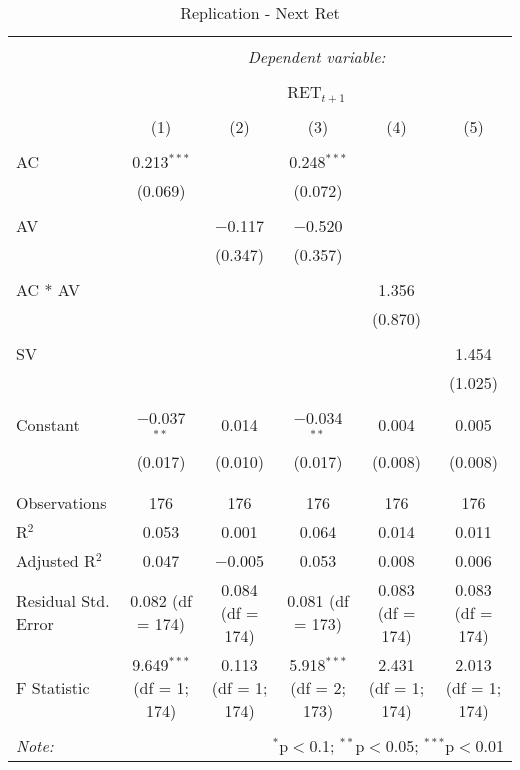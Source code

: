 
\begin{table}[!htbp] \centering 
  \caption{Replication - Next Ret} 
  \label{} 
\begin{adjustbox}{width=1\textwidth}
	\begin{tabular}{@{\extracolsep{5pt}}lccccc} 
\\[-1.8ex]\hline 
\hline \\[-1.8ex] 
 & \multicolumn{5}{c}{\textit{Dependent variable:}} \\ 
\cline{2-6} 
\\[-1.8ex] & \multicolumn{5}{c}{RET$_{t+1}$} \\ 
\\[-1.8ex] & (1) & (2) & (3) & (4) & (5)\\ 
\hline \\[-1.8ex] 
 AC & 0.213$^{***}$ &  & 0.248$^{***}$ &  &  \\ 
  & (0.069) &  & (0.072) &  &  \\ 
  & & & & & \\ 
 AV &  & $-$0.117 & $-$0.520 &  &  \\ 
  &  & (0.347) & (0.357) &  &  \\ 
  & & & & & \\ 
 AC * AV &  &  &  & 1.356 &  \\ 
  &  &  &  & (0.870) &  \\ 
  & & & & & \\ 
 SV &  &  &  &  & 1.454 \\ 
  &  &  &  &  & (1.025) \\ 
  & & & & & \\ 
 Constant & $-$0.037$^{**}$ & 0.014 & $-$0.034$^{**}$ & 0.004 & 0.005 \\ 
  & (0.017) & (0.010) & (0.017) & (0.008) & (0.008) \\ 
  & & & & & \\ 
\hline \\[-1.8ex] 
Observations & 176 & 176 & 176 & 176 & 176 \\ 
R$^{2}$ & 0.053 & 0.001 & 0.064 & 0.014 & 0.011 \\ 
Adjusted R$^{2}$ & 0.047 & $-$0.005 & 0.053 & 0.008 & 0.006 \\ 
Residual Std. Error & 0.082 (df = 174) & 0.084 (df = 174) & 0.081 (df = 173) & 0.083 (df = 174) & 0.083 (df = 174) \\ 
F Statistic & 9.649$^{***}$ (df = 1; 174) & 0.113 (df = 1; 174) & 5.918$^{***}$ (df = 2; 173) & 2.431 (df = 1; 174) & 2.013 (df = 1; 174) \\ 
\hline 
\hline \\[-1.8ex] 
\textit{Note:}  & \multicolumn{5}{r}{$^{*}$p$<$0.1; $^{**}$p$<$0.05; $^{***}$p$<$0.01} \\ 
\end{tabular}
\end{adjustbox} 
\end{table} 
